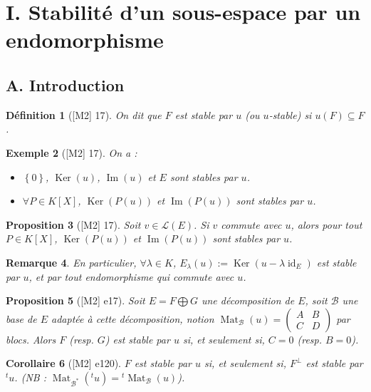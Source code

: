\documentclass[10pt, a4paper, parskip=full, twoside, twocolumn]{report}
\newtheorem{definition}{Définition}
\newtheorem{proposition}[definition]{Proposition}
\newtheorem{corollary}[definition]{Corollaire}
\newtheorem{example}[definition]{Exemple}
\newtheorem{remark}[definition]{Remarque}
\DeclareMathOperator{\im}{Im}
\DeclareMathOperator{\Ker}{Ker}
\DeclareMathOperator{\Mat}{Mat}
\DeclareMathOperator{\id}{id}
\begin{document}
\section*{I. Stabilité d'un sous-espace par un endomorphisme}
\subsection*{A. Introduction}

\begin{definition}[\textnormal{[M2] 17}]
	On dit que $F$ est \emph{stable par $u$} (ou \emph{$u$-stable}) si $u(F)\subseteq F$.
\end{definition}

\begin{example}[\textnormal{[M2] 17}]
	On a :
	\begin{itemize}
		\item $\left\{0\right\}$, $\Ker(u)$, $\im(u)$ et $E$ sont stables par $u$.
		\item $\forall P\in K[X]$, $\Ker(P(u))$ et $\im(P(u))$ sont stables par $u$.
	\end{itemize}
\end{example}

\begin{proposition}[\textnormal{[M2] 17}]
	Soit $v\in\mathcal{L}(E)$. Si $v$ commute avec $u$, alors pour tout $P\in K[X]$,
	$\Ker(P(u))$ et $\im(P(u))$ sont stables par $u$.
\end{proposition}

\begin{remark}
	En particulier, $\forall \lambda\in K$, $E_{\lambda}(u) := \Ker(u-\lambda \id_E)$ est 
	stable par $u$, et par tout endomorphisme qui commute avec $u$.
\end{remark}

\begin{proposition}[\textnormal{[M2] e17}]
	Soit $E = F\bigoplus G$ une décomposition de $E$, soit $\mathcal{B}$ une base de $E$ 
	adaptée à cette décomposition, notion $\Mat_{\mathcal{B}}(u) = \begin{pmatrix}
		A & B \\ C & D
	\end{pmatrix}$ par blocs. Alors $F$ (resp. $G$) est stable par $u$ si, et seulement si, $C=0$ (resp. $B = 0$).
\end{proposition}

\begin{corollary}[\textnormal{[M2] e120}]
	$F$ est stable par $u$ si, et seulement si, $F^{\perp}$ est stable par ${}^tu$.
	(NB : $\Mat_{\mathcal{B}^*}({}^t u) = {}^t\Mat_{\mathcal{B}}(u)$).
\end{corollary}
\end{document}
